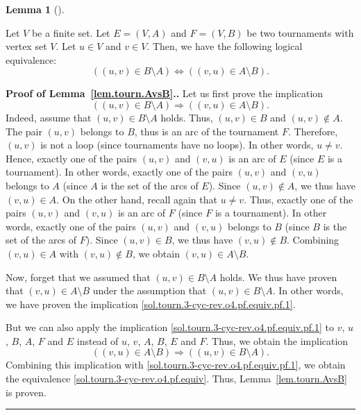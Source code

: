 \documentclass[numbers=enddot,12pt,final,onecolumn,notitlepage]{scrartcl}%
\theoremstyle{definition}
\newtheorem{lem}[theo]{Lemma}
\newenvironment{lemma}[1][]
{\begin{lem}[#1]\begin{leftbar}}
{\end{leftbar}\end{lem}}
\newenvironment{proof}[1][Proof]{\noindent\textbf{#1.} }{\ \rule{0.5em}{0.5em}}
\newcommand{\tup}[1]{\left( #1 \right)}
\begin{document}
\begin{lemma} \label{lem.tourn.AvsB}
Let $V$ be a finite set. Let $E = \tup{V, A}$ and $F = \tup{V, B}$ be
two tournaments with vertex set $V$. Let $u \in V$ and $v \in V$.
Then, we have the following logical equivalence:
\begin{equation}
\tup{ \tup{u, v} \in B \setminus A }
\Longleftrightarrow
\tup{ \tup{v, u} \in A \setminus B } .
\label{sol.tourn.3-cyc-rev.o4.pf.equiv}
\end{equation}
\end{lemma}

\begin{proof}[Proof of Lemma~\ref{lem.tourn.AvsB}.]
Let us first prove the implication
\begin{equation}
\tup{ \tup{u, v} \in B \setminus A }
\Longrightarrow
\tup{ \tup{v, u} \in A \setminus B }.
\label{sol.tourn.3-cyc-rev.o4.pf.equiv.pf.1}
\end{equation}
Indeed, assume that $\tup{u, v} \in B \setminus A$ holds.
Thus, $\tup{u, v} \in B$ and $\tup{u, v} \notin A$. The pair
$\tup{u, v}$ belongs to $B$, thus is an arc of the tournament $F$.
Therefore, $\tup{u, v}$ is not a loop (since tournaments have no
loops). In other words, $u \neq v$. Hence, exactly one of the pairs
$\tup{u, v}$ and $\tup{v, u}$ is an arc of $E$ (since $E$ is a
tournament). In other words, exactly one of the pairs
$\tup{u, v}$ and $\tup{v, u}$ belongs to $A$ (since $A$ is the set of
the arcs of $E$). Since $\tup{u, v} \notin A$, we thus have
$\tup{v, u} \in A$.
On the other hand, recall again that $u \neq v$. Thus, exactly one of
the pairs $\tup{u, v}$ and $\tup{v, u}$ is an arc of $F$ (since $F$ is
a tournament). In other words, exactly one of the pairs
$\tup{u, v}$ and $\tup{v, u}$ belongs to $B$ (since $B$ is the set of
the arcs of $F$). Since $\tup{u, v} \in B$, we thus have
$\tup{v, u} \notin B$. Combining $\tup{v, u} \in A$ with
$\tup{v, u} \notin B$, we obtain $\tup{v, u} \in A \setminus B$.

Now, forget that we assumed that
$\tup{u, v} \in B \setminus A$ holds. We thus have proven that
$\tup{v, u} \in A \setminus B$ under the assumption that
$\tup{u, v} \in B \setminus A$. In other words, we have proven the
implication \eqref{sol.tourn.3-cyc-rev.o4.pf.equiv.pf.1}.

But we can also apply the implication
\eqref{sol.tourn.3-cyc-rev.o4.pf.equiv.pf.1} to $v$, $u$, $B$, $A$,
$F$ and $E$ instead of $u$, $v$, $A$, $B$, $E$ and $F$. Thus, we
obtain the implication
\begin{equation}
\tup{ \tup{v, u} \in A \setminus B }
\Longrightarrow
\tup{ \tup{u, v} \in B \setminus A }.
\end{equation}
Combining this implication with
\eqref{sol.tourn.3-cyc-rev.o4.pf.equiv.pf.1}, we obtain the
equivalence \eqref{sol.tourn.3-cyc-rev.o4.pf.equiv}. Thus,
Lemma~\ref{lem.tourn.AvsB} is proven.
\end{proof}
\end{document}
